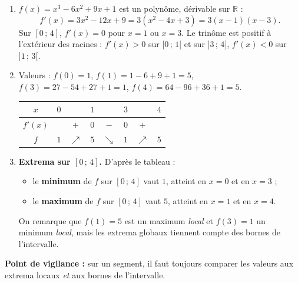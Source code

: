 \documentclass[11pt]{article}
\begin{document}
\begin{corrige}
\begin{enumerate}
    \item $f(x)=x^3-6x^2+9x+1$ est un polynôme, dérivable sur $\mathbb{R}$ :
    \[
    f'(x)=3x^2-12x+9=3(x^2-4x+3)=3(x-1)(x-3).
    \]
    Sur $[0\,;\,4]$, $f'(x)=0$ pour $x=1$ ou $x=3$. Le trinôme est positif à l'extérieur des racines : $f'(x)>0$ sur $[0\,;\,1[$ et sur $]3\,;\,4]$, $f'(x)<0$ sur $]1\,;\,3[$.
    \item Valeurs : $f(0)=1$, $f(1)=1-6+9+1=5$, $f(3)=27-54+27+1=1$, $f(4)=64-96+36+1=5$.
    \begin{center}
    \begin{tabular}{|c|ccccccc|}\hline
    $x$ & $0$ & & $1$ & & $3$ & & $4$ \\ \hline
    $f'(x)$ & & $+$ & $0$ & $-$ & $0$ & $+$ & \\ \hline
    $f$ & $1$ & $\nearrow$ & $5$ & $\searrow$ & $1$ & $\nearrow$ & $5$ \\ \hline
    \end{tabular}
    \end{center}
    \item \textbf{Extrema sur $[0\,;\,4]$.} D'après le tableau :
    \begin{itemize}
        \item le \textbf{minimum} de $f$ sur $[0\,;\,4]$ vaut $1$, atteint en $x=0$ et en $x=3$ ;
        \item le \textbf{maximum} de $f$ sur $[0\,;\,4]$ vaut $5$, atteint en $x=1$ et en $x=4$.
    \end{itemize}
    On remarque que $f(1)=5$ est un maximum \emph{local} et $f(3)=1$ un minimum \emph{local}, mais les extrema globaux tiennent compte des bornes de l'intervalle.
\end{enumerate}

\textbf{Point de vigilance :} sur un segment, il faut toujours comparer les valeurs aux extrema locaux \emph{et} aux bornes de l'intervalle.
\end{corrige}
\end{document}
